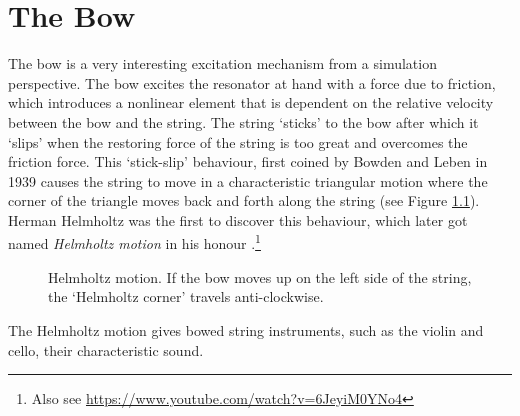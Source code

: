\chapter{The Bow}\label{ch:bow}
The bow is a very interesting excitation mechanism from a simulation perspective.
The bow excites the resonator at hand with a force due to friction, which introduces a nonlinear element that is dependent on the relative velocity between the bow and the string. 
The string `sticks' to the bow after which it `slips' when the restoring force of the string is too great and overcomes the friction force. This `stick-slip' behaviour, first coined by Bowden and Leben in 1939 \cite{Bowden1939} causes the string to move in a characteristic triangular motion where the corner of the triangle moves back and forth along the string (see Figure \ref{fig:helmholtz}). Herman Helmholtz was the first to discover this behaviour, which later got named \textit{Helmholtz motion} in his honour \cite{Helmholtz1860}.\footnote{Also see \url{https://www.youtube.com/watch?v=6JeyiM0YNo4}}

\begin{figure}[h]
    \centering
    \caption{Helmholtz motion. If the bow moves up on the left side of the string, the `Helmholtz corner' travels anti-clockwise. \label{fig:helmholtz}}
\end{figure}

The Helmholtz motion gives bowed string instruments, such as the violin and cello, their characteristic sound. 

